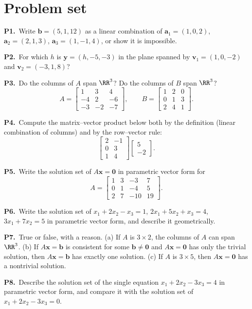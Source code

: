 \documentclass[10pt]{scrartcl}
\newcommand{\vv}[1]{\mathbf{#1}}
\begin{document}
\section{Problem set}
\begin{prob}\textbf{P1.}\ Write $\vv b=(5,1,12)$ as a linear combination of $\vv a_1=(1,0,2)$, $\vv a_2=(2,1,3)$, $\vv a_3=(1,-1,4)$, or show it is impossible.
\end{prob}
\begin{prob}\textbf{P2.}\ For which $h$ is $\vv y=(h,-5,-3)$ in the plane spanned by $\vv v_1=(1,0,-2)$ and $\vv v_2=(-3,1,8)$?
\end{prob}
\begin{prob}\textbf{P3.}\ Do the columns of $A$ span $\RR^3$? Do the columns of $B$ span $\RR^3$?
\[
  A = \begin{bmatrix} 1 & 3 & 4 \\ -4 & 2 & -6 \\ -3 & -2 & -7 \end{bmatrix},
  \qquad
  B = \begin{bmatrix} 1 & 2 & 0 \\ 0 & 1 & 3 \\ 2 & 4 & 1 \end{bmatrix}.
\]
\end{prob}
\begin{prob}\textbf{P4.}\ Compute the matrix--vector product below both by the definition (linear combination of columns) and by the row--vector rule:
\[
  \begin{bmatrix} 2 & -1 \\ 0 & 3 \\ 1 & 4 \end{bmatrix}\begin{bmatrix} 5 \\ -2 \end{bmatrix}.
\]
\end{prob}
\begin{prob}\textbf{P5.}\ Write the solution set of $A\vv x=\vv0$ in parametric vector form for
\[
  A = \begin{bmatrix} 1 & 3 & -3 & 7 \\ 0 & 1 & -4 & 5 \\ 2 & 7 & -10 & 19 \end{bmatrix}.
\]
\end{prob}
\begin{prob}\textbf{P6.}\ Write the solution set of $x_1+2x_2-x_3=1$, $2x_1+5x_2+x_3=4$, $3x_1+7x_2=5$ in parametric vector form, and describe it geometrically.
\end{prob}
\begin{prob}\textbf{P7.}\ True or false, with a reason. (a) If $A$ is $3\times2$, the columns of $A$ can span $\RR^3$. (b) If $A\vv x=\vv b$ is consistent for some $\vv b\ne\vv0$ and $A\vv x=\vv0$ has only the trivial solution, then $A\vv x=\vv b$ has exactly one solution. (c) If $A$ is $3\times5$, then $A\vv x=\vv0$ has a nontrivial solution.
\end{prob}
\begin{prob}\textbf{P8.}\ Describe the solution set of the single equation $x_1+2x_2-3x_3=4$ in parametric vector form, and compare it with the solution set of $x_1+2x_2-3x_3=0$.
\end{prob}
\end{document}
